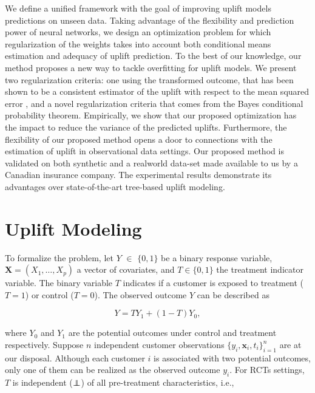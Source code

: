 \documentclass{article}
\newcommand\independent{\protect\mathpalette{\protect\independenT}{\perp}}
\def\independenT#1#2{\mathrel{\rlap{$#1#2$}\mkern2mu{#1#2}}}
\def\X{\mathbf X}
\begin{document}
We define a unified framework with the goal of improving uplift models predictions on unseen data. Taking advantage of the flexibility and prediction power of neural networks, we design an optimization problem for which regularization of the weights takes into account both conditional means estimation and adequacy of uplift prediction. To the best of our knowledge, our method proposes a new way to tackle overfitting for uplift models. We present two regularization criteria: one using the transformed outcome, that has been shown to be a consistent estimator of the uplift with respect to the mean squared error \citep{gutierrez2017causal}, and a novel regularization criteria that comes from the Bayes conditional probability theorem. 
Empirically, we show that our proposed optimization has the impact to reduce the variance of the predicted uplifts. Furthermore, the flexibility of our proposed method opens a door to connections with the estimation of uplift in observational data settings. Our proposed method is validated on both synthetic and a realworld data-set made available to us by a Canadian insurance company. The experimental results demonstrate its advantages over state-of-the-art tree-based uplift modeling.


\section{Uplift Modeling}
\label{sec:literature}

To formalize the problem, let $Y$ $\in$ $\lbrace0,1\rbrace$ be a binary response variable, $\X=(X_{1},\ldots,X_{p})$ a vector of covariates, and $T\in\lbrace0,1\rbrace$ the treatment indicator variable. The binary variable $T$ indicates if a customer is exposed to treatment ($T=1$) or control ($T=0$). The observed outcome $Y$ can be described as 

$$Y=TY_1 + (1-T)Y_0,$$

where $Y_0$  and $Y_1$ are the potential outcomes under control and treatment respectively. Suppose $n$ independent customer observations $\{y_i, \textbf{x}_i, t_i\}_{i=1}^n$ are at our disposal. Although each customer $i$ is associated with two potential outcomes, only one of them can be realized as the observed outcome $y_i$. For RCTs settings, $T$ is independent ($\independent$) of all pre-treatment characteristics, i.e.,
\end{document}
